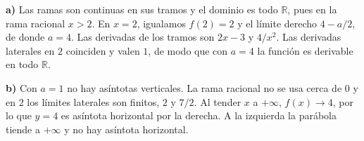 \textbf{a)} Las ramas son continuas en sus tramos y el dominio es todo $\mathbb R$, pues en la rama racional $x>2$. En $x=2$, igualamos $f(2)=2$ y el límite derecho $4-a/2$, de donde $\boxed{a=4}$. Las derivadas de los tramos son $2x-3$ y $4/x^2$. Las derivadas laterales en $2$ coinciden y valen $1$, de modo que con $a=4$ la función es derivable en todo $\mathbb R$.

\textbf{b)} Con $a=1$ no hay asíntotas verticales. La rama racional no se usa cerca de $0$ y en $2$ los límites laterales son finitos, $2$ y $7/2$. Al tender $x$ a $+\infty$, $f(x)\to4$, por lo que $\boxed{y=4}$ es asíntota horizontal por la derecha. A la izquierda la parábola tiende a $+\infty$ y no hay asíntota horizontal.
